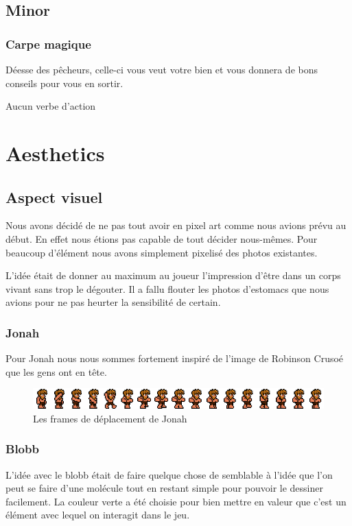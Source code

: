 \documentclass{prologArticle}
\begin{document}
\subsection{Minor}

\subsubsection{Carpe magique}
Déesse des pêcheurs, celle-ci vous veut votre bien et vous donnera de bons conseils pour vous en sortir.

Aucun verbe d'action




\section{Aesthetics}

\subsection{Aspect visuel}
Nous avons décidé de ne pas tout avoir en pixel art comme nous avions prévu au début. En effet nous étions pas capable de tout décider nous-mêmes. Pour beaucoup d'élément nous avons simplement pixelisé des photos existantes.

L'idée était de donner au maximum au joueur l'impression d'être dans un corps vivant sans trop le dégouter. Il a fallu flouter les photos d'estomacs que nous avions pour ne pas heurter la sensibilité de certain.

\subsubsection{Jonah}
Pour Jonah nous nous sommes fortement inspiré de l'image de Robinson Crusoé que les gens ont en tête.

\begin{figure}[H]
    \centering
    \includegraphics[width=\textwidth]{res/jona_sheet.png}
    \caption{Les frames de déplacement de Jonah}
\end{figure}

\subsubsection{Blobb}
L'idée avec le blobb était de faire quelque chose de semblable à l'idée que l'on peut se faire d'une molécule tout en restant simple pour pouvoir le dessiner facilement. La couleur verte a été choisie pour bien mettre en valeur que c'est un élément avec lequel on interagit dans le jeu.
\end{document}
